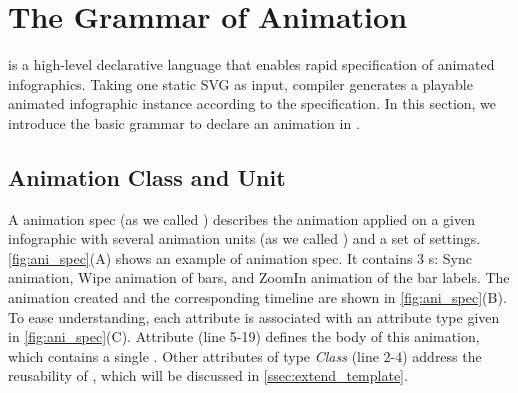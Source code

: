 \section{The \gaia{} Grammar of Animation}
\label{sec:gaia_ani}

\gaia{} is a high-level declarative language that enables rapid specification of animated infographics.
Taking one static SVG as input, \gaia{} compiler generates a playable animated infographic instance according to the \gaia{} specification.
In this section, we introduce the basic grammar to declare an animation in \gaia{}.

\subsection{Animation Class and Unit}
\label{ssec:aniclass_aniunit}


A \gaia{} animation spec (as we called \aniclass{}) describes the animation applied on a given infographic with several animation units (as we called \aniunit{}) and a set of settings.
\autoref{fig:ani_spec}(A) shows an example of animation spec.
It contains 3 \aniunit{}s: Sync animation, Wipe animation of bars, and ZoomIn animation of the bar labels.
The animation created and the corresponding timeline are shown in \autoref{fig:ani_spec}(B).
To ease understanding, each attribute is associated with an attribute type given in \autoref{fig:ani_spec}(C).
Attribute  (line 5-19) defines the body of this animation, which contains a single \aniunit{}.
Other attributes of type \textit{Class} (line 2-4) address the reusability of \gaia{}, which will be discussed in \autoref{ssec:extend_template}.


